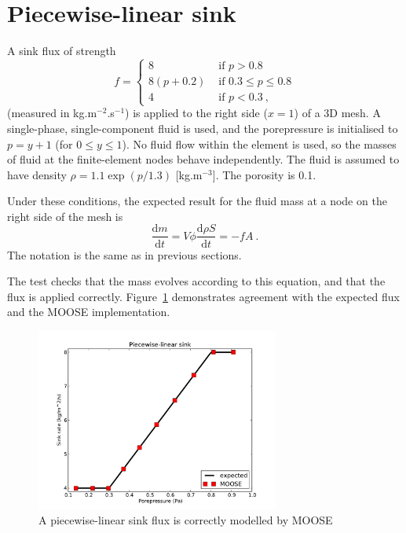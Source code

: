 \documentclass[]{scrreprt}
\def\d{\mathrm{d}}
\begin{document}
\section{Piecewise-linear sink}
\label{piecewise.sec}

A sink flux of strength
\begin{equation}
f = \left\{
\begin{array}{ll}
8 & \mbox{ if } p > 0.8 \\
8(p + 0.2) & \mbox{ if } 0.3 \leq p \leq 0.8 \\
4 & \mbox{ if } p < 0.3 \ ,
\end{array}
\right.
\end{equation}
(measured in kg.m$^{-2}$.s$^{-1}$) is applied to the right side
($x=1$) of a 3D mesh.  A single-phase, single-component fluid is used,
and the porepressure is initialised to $p=y+1$ (for $0\leq y \leq 1$).
No fluid flow within the element is used, so the masses of fluid at
the finite-element nodes behave independently.  The fluid is assumed
to have density $\rho = 1.1 \exp(p/1.3)$ [kg.m$^{-3}$].  The porosity
is 0.1.

Under these conditions, the expected result for the fluid mass at a
node on the right side of the mesh is
\begin{equation}
\frac{\d m}{\d t} = V\phi \frac{\d \rho S}{\d t} = -f A \ .
\end{equation}
The notation is the same as in previous sections.

The test checks that the mass evolves according to this equation, and
that the flux is applied correctly.  Figure~\ref{s04.fig} demonstrates
agreement with the expected flux and the MOOSE implementation.

\begin{figure}[htb]
\begin{center}
\includegraphics[width=8cm]{s04.pdf}
\caption{A piecewise-linear sink flux is correctly modelled by MOOSE}
\label{s04.fig}
\end{center}
\end{figure}
\end{document}
